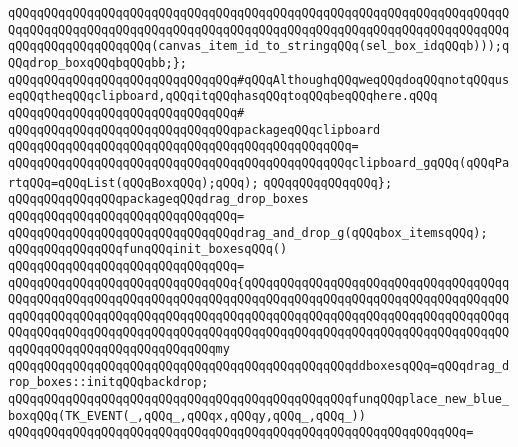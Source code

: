 \verb|qQQqqQQqqQQqqQQqqQQqqQQqqQQqqQQqqQQqqQQqqQQqqQQqqQQqqQQqqQQqqQQqqQQqqQQqqQQqqQQqqQQqqQQqqQQqqQQqqQQqqQQqqQQqqQQqqQQqqQQqqQQqqQQqqQQqqQQqqQQqqQQqqQQqqQQqqQQqqQQq(canvas_item_id_to_stringqQQq(sel_box_idqQQqb)));qQQqdrop_boxqQQqbqQQqbb;};|\newline
\newline
\verb|qQQqqQQqqQQqqQQqqQQqqQQqqQQqqQQq#qQQqAlthoughqQQqweqQQqdoqQQqnotqQQquseqQQqtheqQQqclipboard,qQQqitqQQqhasqQQqtoqQQqbeqQQqhere.qQQq|\newline
\verb|qQQqqQQqqQQqqQQqqQQqqQQqqQQqqQQq#|\newline
\verb|qQQqqQQqqQQqqQQqqQQqqQQqqQQqqQQqpackageqQQqclipboard|\newline
\verb|qQQqqQQqqQQqqQQqqQQqqQQqqQQqqQQqqQQqqQQqqQQqqQQq=|\newline
\verb|qQQqqQQqqQQqqQQqqQQqqQQqqQQqqQQqqQQqqQQqqQQqqQQqclipboard_gqQQq(qQQqPartqQQq=qQQqList(qQQqBoxqQQq);qQQq);|\newline
\verb|qQQqqQQqqQQqqQQq};|\newline
\newline
\newline
\verb|qQQqqQQqqQQqqQQqpackageqQQqdrag_drop_boxes|\newline
\verb|qQQqqQQqqQQqqQQqqQQqqQQqqQQqqQQq=|\newline
\verb|qQQqqQQqqQQqqQQqqQQqqQQqqQQqqQQqdrag_and_drop_g(qQQqbox_itemsqQQq);|\newline
\newline
\newline
\verb|qQQqqQQqqQQqqQQqfunqQQqinit_boxesqQQq()|\newline
\verb|qQQqqQQqqQQqqQQqqQQqqQQqqQQqqQQq=|\newline
\verb|qQQqqQQqqQQqqQQqqQQqqQQqqQQqqQQq{qQQqqQQqqQQqqQQqqQQqqQQqqQQqqQQqqQQqqQQqqQQqqQQqqQQqqQQqqQQqqQQqqQQqqQQqqQQqqQQqqQQqqQQqqQQqqQQqqQQqqQQqqQQqqQQqqQQqqQQqqQQqqQQqqQQqqQQqqQQqqQQqqQQqqQQqqQQqqQQqqQQqqQQqqQQqqQQqqQQqqQQqqQQqqQQqqQQqqQQqqQQqqQQqqQQqqQQqqQQqqQQqqQQqqQQqqQQqqQQqqQQqqQQqqQQqqQQqqQQqqQQqqQQqqQQqqQQqmy|\newline
\verb|qQQqqQQqqQQqqQQqqQQqqQQqqQQqqQQqqQQqqQQqqQQqqQQqddboxesqQQq=qQQqdrag_drop_boxes::initqQQqbackdrop;|\newline
\newline
\verb|qQQqqQQqqQQqqQQqqQQqqQQqqQQqqQQqqQQqqQQqqQQqqQQqfunqQQqplace_new_blue_boxqQQq(TK_EVENT(_,qQQq_,qQQqx,qQQqy,qQQq_,qQQq_))|\newline
\verb|qQQqqQQqqQQqqQQqqQQqqQQqqQQqqQQqqQQqqQQqqQQqqQQqqQQqqQQqqQQqqQQq=|\newline
